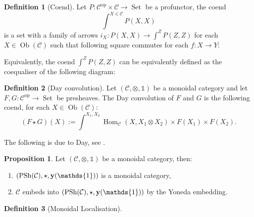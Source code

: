 \documentclass[8pt]{article}
\theoremstyle{definition}
\newtheorem{definition}{Definition}[section]
\theoremstyle{definition}
\theoremstyle{definition}
\theoremstyle{definition}
\theoremstyle{definition}
\theoremstyle{definition}
\theoremstyle{definition}
\newtheorem{prop}{Proposition}[section]
\theoremstyle{definition}
\theoremstyle{definition}
\theoremstyle{definition}
\theoremstyle{definition}
\theoremstyle{definition}
\theoremstyle{definition}
\theoremstyle{question}
\newcommand{\Ob}[1]{\operatorname{Ob}({\mathcal{#1}})}
\begin{document}
\begin{definition}[Coend]
  Let $P : \mathcal{C}^{\operatorname{op}} \times \mathcal{C} \to \operatorname{Set}$
  be a profunctor, the coend
    \[\int^{X \in \mathcal{C}} P(X, X)\]
    is a set with a family of arrows $i_X : P(X, X) \to \int^Z P(Z, Z)$
    for each $X \in \operatorname{Ob}(\mathcal{C})$ such that following square commutes for each $f : X \to Y$:

    \centerline{
    }

\end{definition}

Equivalently, the coend $\int^Z P(Z,Z)$ can be equivalently defined as the coequaliser of the following diagram:

\centerline{
}

\begin{definition}[Day convolution]
  Let $(\mathcal{C}, \otimes, \mathds{1})$ be a monoidal category and let
  $F, G : \mathcal{C}^{\operatorname{op}} \to \operatorname{Set}$ be presheaves. 
  The Day convolution of $F$ and $G$ is the following coend, for each $X \in \Ob{C}$:
    \[
    (F \star G)(X) := \int^{X_1, X_2} \operatorname{Hom}_{\mathcal{C}}(X, X_1 \otimes X_2) \times F(X_1) \times F(X_2).
    \]
\end{definition}

The following is due to Day, see \cite{day1970construction}.

\begin{prop}
  Let $(\mathcal{C}, \otimes, \mathds{1})$ be a monoidal category, then:
  \begin{enumerate}
    \item $(\operatorname{PSh}(\mathcal{C}), \star, {\bf y}(\mathds{1}))$ is a monoidal category,
    \item $\mathcal{C}$ embeds into $(\operatorname{PSh}(\mathcal{C}), \star, {\bf y}(\mathds{1}))$
    by the Yoneda embedding.
  \end{enumerate}
\end{prop}

\begin{definition}[Monoidal Localisation]
\end{definition}
\end{document}
